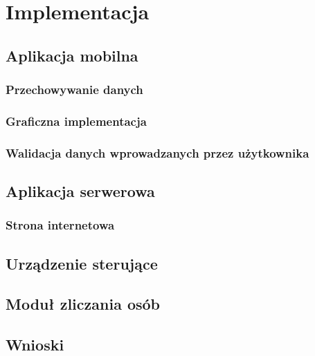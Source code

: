 \newpage\section{Implementacja} \label{sec:implementacja}
\subsection{Aplikacja mobilna}
	\subsubsection{Przechowywanie danych}
	\subsubsection{Graficzna implementacja}
	\subsubsection{Walidacja danych wprowadzanych przez użytkownika}

\newpage
\subsection{Aplikacja serwerowa}
	\subsubsection{Strona internetowa}

\newpage
\subsection{Urządzenie sterujące}

\newpage
\subsection{Moduł zliczania osób}

\newpage
\subsection{Wnioski}




 
